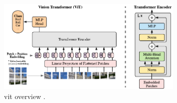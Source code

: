 \begin{figure}[t]
    \centering
    \includegraphics[width=0.8\textwidth]{fig/rel/images/vit_schema.pdf}
    \caption{\gls{vit} overview \autocite{dosovitskiy2020image}.}
    \label{fig:rel_vit}
\end{figure}